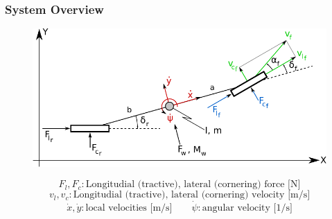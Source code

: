 \documentclass{beamer}
\begin{document}
\begin{frame}
\frametitle{System Overview}

\begin{figure} [h]
\begin{center}
\includegraphics[scale=0.8]{images/dynamics_overview.pdf}
\label{fig:pendel}
\end{center}
\end{figure}
\[F_l, F_c : \text{Longitudial (tractive), lateral (cornering) force [N]}\]
\[v_l, v_c : \text{Longitudial (tractive), lateral (cornering) velocity [m/s]}\]
\[\dot{x}, \dot{y} : \text{local velocities [m/s]} \qquad \dot{\psi} :
\text{angular velocity [1/s]}\]

\end{frame}
\end{document}
